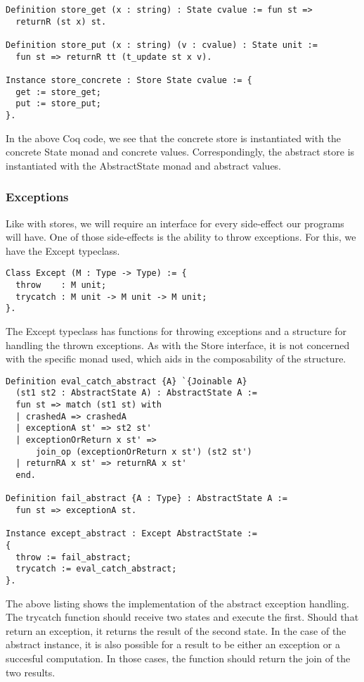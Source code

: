 \begin{verbatim}
Definition store_get (x : string) : State cvalue := fun st =>
  returnR (st x) st.

Definition store_put (x : string) (v : cvalue) : State unit := 
  fun st => returnR tt (t_update st x v).

Instance store_concrete : Store State cvalue := {
  get := store_get;
  put := store_put;
}.
\end{verbatim}

In the above Coq code, we see that the concrete store is instantiated with the
concrete State monad and concrete values. Correspondingly, the abstract store
is instantiated with the AbstractState monad and abstract values.

\subsubsection{Exceptions}
Like with stores, we will require an interface for every side-effect our
programs will have. One of those side-effects is the ability to throw
exceptions. For this, we have the Except typeclass.

\begin{verbatim}
Class Except (M : Type -> Type) := {
  throw    : M unit;
  trycatch : M unit -> M unit -> M unit;
}.
\end{verbatim}

The Except typeclass has functions for throwing exceptions and a structure for
handling the thrown exceptions. As with the Store interface, it is not
concerned with the specific monad used, which aids in the composability of the
structure. 

\begin{verbatim}
Definition eval_catch_abstract {A} `{Joinable A} 
  (st1 st2 : AbstractState A) : AbstractState A :=
  fun st => match (st1 st) with
  | crashedA => crashedA 
  | exceptionA st' => st2 st'
  | exceptionOrReturn x st' => 
      join_op (exceptionOrReturn x st') (st2 st')
  | returnRA x st' => returnRA x st'
  end.

Definition fail_abstract {A : Type} : AbstractState A :=
  fun st => exceptionA st.

Instance except_abstract : Except AbstractState := 
{
  throw := fail_abstract;
  trycatch := eval_catch_abstract;
}.
\end{verbatim}

The above listing shows the implementation of the abstract exception handling.
The trycatch function should receive two states and execute the first. Should
that return an exception, it returns the result of the second state. In the
case of the abstract instance, it is also possible for a result to be either
an exception or a succesful computation. In those cases, the function should
return the join of the two results.

